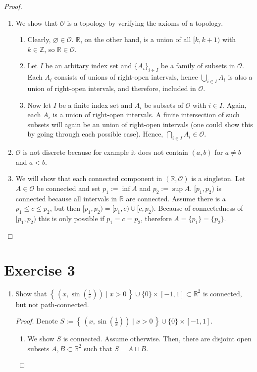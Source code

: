 \documentclass[a4paper]{article}
\newcommand{\makeset}[2]{\left\{\, #1 \mid #2 \,\right\}}
\begin{document}
    \begin{proof}
        \begin{enumerate}
            \item We show that \(\mathcal{O}\) is a topology by verifying the axioms of a topology.
            \begin{enumerate}
                \item Clearly, \(\varnothing \in \mathcal{O}\). \(\mathbb{R}\), on the other hand, is a union of all \([k, k + 1)\) with \(k \in \mathbb{Z}\), so \(\mathbb{R} \in \mathcal{O}\).
                \item Let \(I\) be an arbitary index set and \(\{A_i\}_{i \in I}\) be a family of subsets in \(\mathcal{O}\). Each \(A_i\) consists of unions of right-open intervals, hence \(\bigcup_{i \in I}A_i\) is also a union of right-open intervals, and therefore, included in \(\mathcal{O}\).
                \item Now let \(I\) be a finite index set and \(A_i\) be subsets of \(\mathcal{O}\) with \(i \in I\). Again, each \(A_i\) is a union of right-open intervals. A finite intersection of such subsets will again be an union of right-open intervals (one could show this by going through each possible case). Hence, \(\bigcap_{i\in I}A_i \in \mathcal{O}\).
            \end{enumerate}
            \item \(\mathcal{O}\) is not discrete because for example it does not contain \((a, b)\) for \(a \neq b\) and \(a < b\).
            \item We will show that each connected component in \((\mathbb{R}, \mathcal{O})\) is a singleton. Let \(A \in \mathcal{O}\) be connected and set \(p_1 := \inf A\) and \(p_2 := \sup A\). \([p_1, p_2)\) is connected because all intervals in \(\mathbb{R}\) are connected. Assume there is a \(p_1 \leq c \leq p_2\), but then \([p_1, p_2) = [p_1, c) \cup [c, p_2)\). Because of connectedness of \([p_1, p_2)\) this is only possible if \(p_1 = c = p_2\), therefore \(A = \{p_1\} = \{p_2\}\).
        \end{enumerate}
    \end{proof}
    \section*{Exercise 3}
    \begin{enumerate}
        \item Show that \(\makeset{(x, \sin(\frac{1}{x}))}{x > 0} \cup \{0\} \times [-1, 1] \subset \mathbb{R}^2\) is connected, but not path-connected.
        \begin{proof}
            Denote \(S := \makeset{(x, \sin(\frac{1}{x}))}{x > 0} \cup \{0\} \times [-1, 1]\).
            \begin{enumerate}
                \item We show \(S\) is connected. Assume otherwise. Then, there are disjoint open subsets \(A, B \subset \mathbb{R}^2\) such that \(S = A \sqcup B\).
            \end{enumerate}
        \end{proof}
    \end{enumerate}
\end{document}
